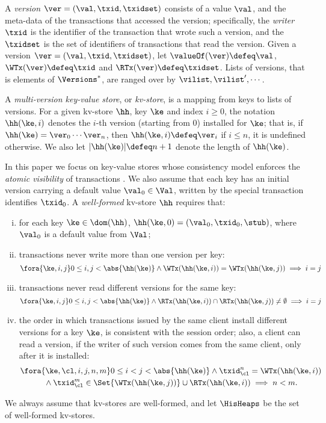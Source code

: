 A \emph{version} $\ver = (\val, \txid, \txidset)$ consists of a value $\val$,
and the meta-data of the transactions that accessed the version; 
specifically, the \emph{writer} $\txid$ is the identifier of the transaction that wrote such a version, 
and the  $\txidset$ is the set of identifiers of transactions that read the version.
Given a version $\ver = (\val, \txid, \txidset)$, let $\valueOf(\ver) \defeq \val$,
$\WTx(\ver) \defeq \txid$ and $\RTx(\ver) \defeq \txidset$.
Lists of versions, that is elements of $\Versions^{\ast}$, are ranged over by $\vilist, \vilist',\cdots$.

A \emph{multi-version key-value store}, or \emph{kv-store}, 
is a mapping from keys to lists of versions. 
For a given kv-store $\hh$, key $\ke$ and index $i \geq 0$, 
the notation $\hh(\ke, i)$ denotes the $i$-th version (starting from $0$) installed for $\ke$;
that is, if $\hh(\ke) = \ver_0 \cdots\ver_{n}$, then $\hh(\ke, i) \defeq \ver_{i}$ if $i \leq n$, it is undefined otherwise. 
We also let $\lvert \hh(\ke) \rvert \defeq n +1 $ denote the length of $\hh(\ke)$.

In this paper we focus on key-value stores whose consistency model enforces the \emph{atomic visibility} of transactions \cite{framework-concur}. 
We also assume that each key has an initial version carrying a default value $\val_0 \in \Val$, 
written by the special transaction identifies $\txid_0$.
A \emph{well-formed} kv-store $\hh$ requires that:
\begin{enumerate}[(i)]
\item\label{kv:wf.init} 
    for each key $\ke \in \dom(\hh)$, $\hh(\ke, 0) = (\val_0, \txid_0, \stub)$, where $\val_0$ is a default value from $\Val$;
\item\label{kv:wf.onewrite} 
    transactions never write more than one version per key:
\[
\fora{\ke, i,j }
0 \leq i, j < \abs{ \hh(\ke) }
\land \WTx(\hh(\ke, i)) = \WTx(\hh(\ke, j))
\implies i = j 
\]
\item\label{kv:wf.oneread} 
    transactions never read different versions for the same key:
\[
\fora{\ke, i,j } 
0 \leq i, j < \abs{ \hh(\ke) }
\land \RTx(\hh(\ke, i)) \cap \RTx(\hh(\ke, j)) \neq \emptyset 
\implies i = j
\]
\item\label{kv:wf.so} 
    the order in which transactions issued by the same client install different versions for a key $\ke$, 
    is consistent with the session order;
    also, a client can read a version, if the writer of such version comes from the same client, only after it is installed:
\begin{multline*}
    \fora{ \ke, \cl, i,j, n, m} 
    0 \leq i < j < \abs{\hh(\ke)} 
    \land \txid_{\cl}^{n} = \WTx(\hh(\ke,i)) \\
    {} \wedge \txid_{\cl}^{m} \in \Set{\WTx(\hh(\ke,j))} \cup \RTx(\hh(\ke, i))
    \implies n < m.
\end{multline*}
\end{enumerate}
We always assume that kv-stores are well-formed, and let $\HisHeaps$ be the set of well-formed kv-stores.

